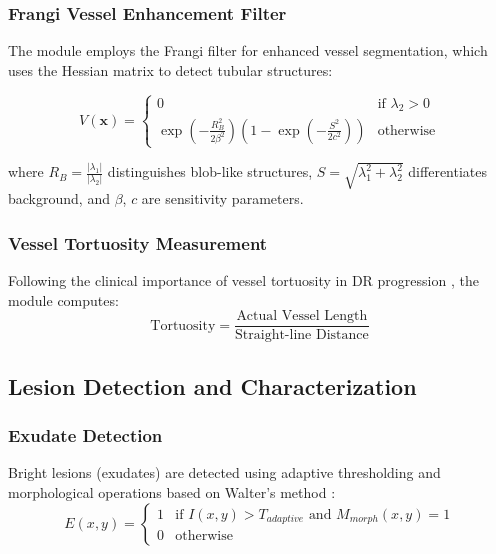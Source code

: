 \documentclass[12pt,a4paper]{article}
\begin{document}
\subsubsection{Frangi Vessel Enhancement Filter}
The module employs the Frangi filter \cite{frangi1998multiscale} for enhanced vessel segmentation, which uses the Hessian matrix to detect tubular structures:

\begin{equation}
V(\mathbf{x}) = \begin{cases}
0 & \text{if } \lambda_2 > 0 \\
\exp\left(-\frac{R_B^2}{2\beta^2}\right)\left(1 - \exp\left(-\frac{S^2}{2c^2}\right)\right) & \text{otherwise}
\end{cases}
\end{equation}

where $R_B = \frac{|\lambda_1|}{|\lambda_2|}$ distinguishes blob-like structures, $S = \sqrt{\lambda_1^2 + \lambda_2^2}$ differentiates background, and $\beta$, $c$ are sensitivity parameters.

\subsubsection{Vessel Tortuosity Measurement}
Following the clinical importance of vessel tortuosity in DR progression \cite{cheung2010retinal}, the module computes:
\begin{equation}
\text{Tortuosity} = \frac{\text{Actual Vessel Length}}{\text{Straight-line Distance}}
\end{equation}

\subsection{Lesion Detection and Characterization}

\subsubsection{Exudate Detection}
Bright lesions (exudates) are detected using adaptive thresholding and morphological operations based on Walter's method \cite{walter2002automatic}:
\begin{equation}
E(x,y) = \begin{cases}
1 & \text{if } I(x,y) > T_{adaptive} \text{ and } M_{morph}(x,y) = 1 \\
0 & \text{otherwise}
\end{cases}
\end{equation}
\end{document}
